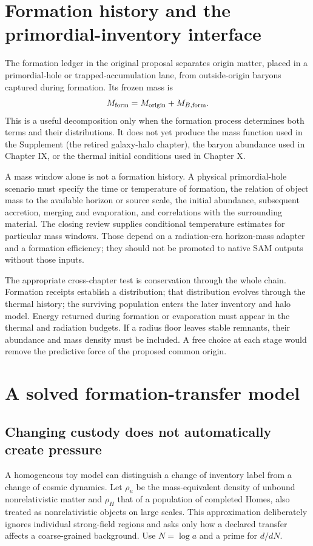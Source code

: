 \section{Formation history and the primordial-inventory interface}
The formation ledger in the original proposal separates origin matter, placed in a primordial-hole or trapped-accumulation lane, from outside-origin baryons captured during formation. Its frozen mass is
\begin{equation}
 M_{\rm form}=M_{\rm origin}+M_{B,\rm form}.
 \label{c12:formationinventory}
\end{equation}
This is a useful decomposition only when the formation process determines both terms and their distributions. It does not yet produce the mass function used in the Supplement (the retired galaxy-halo chapter), the baryon abundance used in Chapter IX, or the thermal initial conditions used in Chapter X.

A mass window alone is not a formation history. A physical primordial-hole scenario must specify the time or temperature of formation, the relation of object mass to the available horizon or source scale, the initial abundance, subsequent accretion, merging and evaporation, and correlations with the surrounding material. The closing review supplies conditional temperature estimates for particular mass windows. Those depend on a radiation-era horizon-mass adapter and a formation efficiency; they should not be promoted to native SAM outputs without those inputs.

The appropriate cross-chapter test is conservation through the whole chain. Formation receipts establish a distribution; that distribution evolves through the thermal history; the surviving population enters the later inventory and halo model. Energy returned during formation or evaporation must appear in the thermal and radiation budgets. If a radius floor leaves stable remnants, their abundance and mass density must be included. A free choice at each stage would remove the predictive force of the proposed common origin.

\section{A solved formation-transfer model}
\subsection{Changing custody does not automatically create pressure}
A homogeneous toy model can distinguish a change of inventory label from a change of cosmic dynamics. Let $\rho_u$ be the mass-equivalent density of unbound nonrelativistic matter and $\rho_H$ that of a population of completed Homes, also treated as nonrelativistic objects on large scales. This approximation deliberately ignores individual strong-field regions and asks only how a declared transfer affects a coarse-grained background. Use $N=\log a$ and a prime for $d/dN$.

